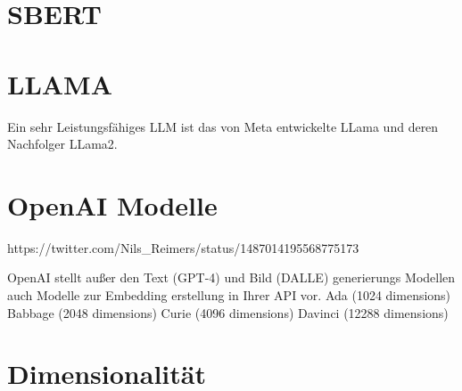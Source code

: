 \section{SBERT}

\section{LLAMA}
Ein sehr Leistungsfähiges LLM ist das von Meta entwickelte LLama und deren Nachfolger LLama2. \cite{touvron2023}

\section{OpenAI Modelle}
https://twitter.com/Nils_Reimers/status/1487014195568775173

OpenAI stellt außer den Text (GPT-4) und Bild (DALLE) generierungs Modellen auch Modelle zur Embedding erstellung in Ihrer API vor.
Ada (1024 dimensions)
Babbage (2048 dimensions)
Curie (4096 dimensions)
Davinci (12288 dimensions)

\section{Dimensionalität}


